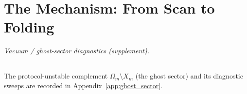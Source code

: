 \part{The Mechanism: From Scan to Folding}





\paragraph{Vacuum / ghost-sector diagnostics (supplement).}
\InterfaceTag The protocol-unstable complement $\Omega_m\setminus X_m$ (the ghost sector) and its diagnostic sweeps are recorded in Appendix~\ref{app:ghost_sector}.


